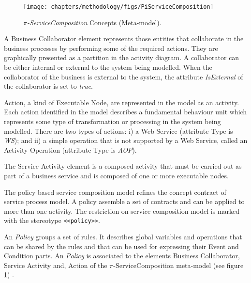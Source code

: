 \begin{figure}[ht!]
\centering
\texttt{[image: chapters/methodology/figs/PiServiceComposition]}
\caption{\textit{$\pi$-ServiceComposition} Concepts (Meta-model).}
\label{fig:servicecomposition}
\end{figure}

A {\sc Business Collaborator} element represents those
entities that collaborate in the business processes by
performing some of the required actions. They are graphically
presented as a partition in the activity diagram.
A collaborator can be either internal or external to the
system being modelled. When the collaborator of the
business is external to the system, the attribute \textit{IsExternal} of the
collaborator is set to \textit{true}.

{\sc Action}, a kind of {\sc Executable Node}, are represented
in the model as an activity. Each action identified in
the model describes a fundamental behaviour unit which
represents some type of transformation or processing
in the system being modelled. There are two types of
actions: i) a Web Service (attribute Type is \textit{WS}); and ii) a
simple operation that is not supported by a Web Service,
called an {\sc Activity Operation} (attribute Type is \textit{AOP}).

The {\sc Service Activity} element is a composed activity
that must be carried out as part of a business service and
is composed of one or more executable nodes.


The policy based service composition model refines the concept contract of
service process model. A policy assemble a set of contracts and can be
applied to more than one activity. The restriction on service composition model
is marked with the stereotype \texttt{<<policy>>}.


An {\em Policy} groups a set of rules. It describes global variables and
operations that can be shared by the rules and that can be used for expressing
their Event  and Condition parts. An {\em Policy} is associated to the
elements {\sc Business Collaborator}, {\sc Service Activity} and, {\sc Action}  of
the $\pi$-ServiceComposition meta-model (see figure
\ref{fig:servicecomposition}) .




